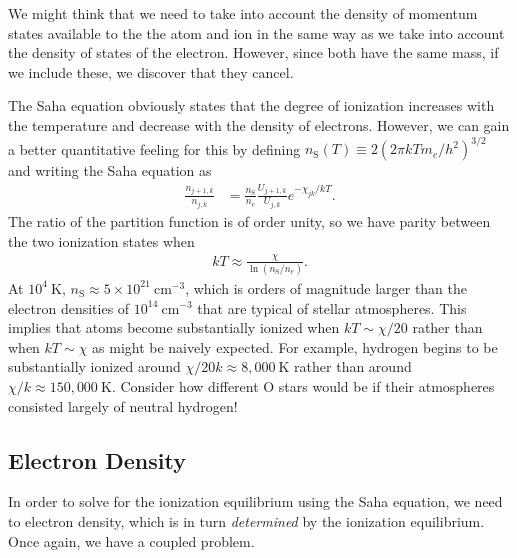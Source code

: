 We might think that we need to take into account the density of momentum states available to the the atom and ion in the same way as we take into account the density of states of the electron. However, since both have the same mass, if we include these, we discover that they cancel. 

\newslide

The Saha equation obviously states that the degree of ionization
increases with the temperature and decrease with the density of
electrons. However, we can gain a better quantitative feeling for this
by defining $n_\mathrm{S}(T) \equiv 2(2 \pi kT m_e/h^2)^{3/2}$ and writing
the Saha equation as
\begin{align}
\frac{n_{j+1,k}}{n_{j,k}} 
&=
\frac{n_\mathrm{S}}{n_e}
\frac{U_{j+1,k}}{U_{j,k}} 
e^{-\chi_{jk}/kT}.
\end{align}
The ratio of the partition function is of order unity, so we have parity
between the two ionization states when
\begin{align}
kT \approx \frac{\chi}{\ln(n_\mathrm{S}/n_e)}.
\end{align}
At $10^4\:\mathrm{K}$, $n_\mathrm{S} \approx 5 \times
10^{21}\:\mathrm{cm^{-3}}$, which is orders of magnitude
larger than the electron densities of
$10^{14}\:\mathrm{cm^{-3}}$ that are typical of stellar
atmospheres. This implies that atoms become substantially
ionized when $kT \sim \chi/20$ rather than when $kT \sim
\chi$ as might be naively expected. For 
example, hydrogen begins to be substantially ionized around $\chi/20k
\approx 8,000\:\mathrm{K}$ rather than around $\chi/k \approx
150,000\:\mathrm{K}$. Consider how different O stars would be
if their atmospheres consisted largely of neutral hydrogen!


\newslide

\subsection{Electron Density}

In order to solve for the ionization equilibrium using the Saha
equation, we need to electron density, which is in turn
\emph{determined} by the ionization equilibrium. Once again, we have a
coupled problem.

